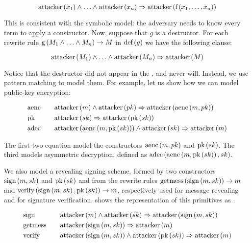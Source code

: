 \begin{equation}
    \mbox{attacker}\left(x_1\right) \land \ldots \land \mbox{attacker}\left(x_n\right) \Rightarrow \mbox{attacker}\left(\mbox{f}\left(x_1,\ldots,x_n\right)\right)
\end{equation}

This is consistent with the symbolic model: the adversary needs to know every term to apply a constructor.
Now, suppose that $g$ is a destructor. For each rewrite rule $\mbox{g}\left(M_1 \land \ldots \land M_n\right) \rightarrow M$ in $\mbox{def}\left(g\right)$ we have the following clause:

\begin{equation}
    \mbox{attacker}\left(M_1\right) \land \ldots \land \mbox{attacker}\left(M_n\right) \Rightarrow \mbox{attacker}\left(M\right)
\end{equation}

Notice that the destructor did not appear in the \Hornc{}, and never will. Instead, we use pattern matching to model them. For example, let us show how we can model public-key encryption:

\begin{equation}
    \begin{alignedat}{3}
        & \mbox{aenc} \qquad && \mbox{attacker}\left(m\right) \land \mbox{attacker}\left(pk\right) \Rightarrow \mbox{attacker}\left(\mbox{aenc}\left(m, pk\right)\right)            \\
        & \mbox{pk} \qquad   && \mbox{attacker}\left(sk\right) \Rightarrow \mbox{attacker}\left(\mbox{pk}\left(sk\right)\right)                                  \\
        & \mbox{adec} \qquad && \mbox{attacker}\left(\mbox{aenc}\left(m, \mbox{pk}\left(sk\right)\right)\right) \land \mbox{attacker}\left(sk\right) \Rightarrow \mbox{attacker}\left(m\right)
    \end{alignedat}
\end{equation}

The first two equation model the constructors $\mbox{aenc}\left(m, pk\right)$ and $\mbox{pk}\left(sk\right)$. The third models asymmetric decryption, defined as $\mbox{adec}\left(\mbox{aenc}\left(m, \mbox{pk}\left(sk\right)\right), sk\right)$.

\sloppy We also model a revealing signing scheme, formed by two constructors $\mbox{sign}\left(m, sk\right)$ and $\mbox{pk}\left(sk\right)$ and from the rewrite rules $\mbox{getmess}\left(\mbox{sign}\left(m, sk\right)\right) \rightarrow m$ and $\mbox{verify}\left(\mbox{sign}\left(m, sk\right), \mbox{pk}\left(sk\right)\right) \rightarrow m$, respectively used for message revealing and for signature verification.  shows the representation of this primitives as \Horncs{}.

\begin{equation}
    \label{eq:signing-horn-clauses}
    \begin{alignedat}{3}
        & \mbox{sign} \qquad    && \mbox{attacker}\left(m\right) \land \mbox{attacker}\left(sk\right) \Rightarrow \mbox{attacker}\left(\mbox{sign}\left(m, sk\right)\right)            \\
        & \mbox{getmess} \qquad && \mbox{attacker}\left(\mbox{sign}\left(m, sk\right)\right) \Rightarrow \mbox{attacker}\left(m\right)                              \\
        & \mbox{verify} \qquad  && \mbox{attacker}\left(\mbox{sign}\left(m, sk\right)\right) \land \mbox{attacker}\left(\mbox{pk}\left(sk\right)\right) \Rightarrow \mbox{attacker}\left(m\right)
    \end{alignedat}
\end{equation}

